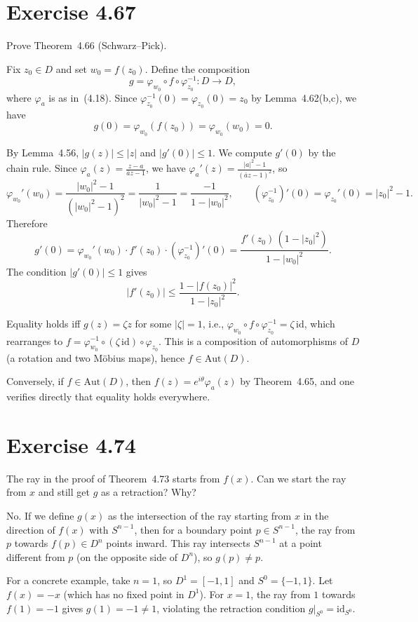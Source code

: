 \documentclass{article}
\begin{document}
\section{Exercise 4.67}

Prove Theorem~4.66 (Schwarz--Pick).

\begin{solution}
  Fix $z_0 \in D$ and set $w_0 = f(z_0)$. Define the composition
  \[
    g = \varphi_{w_0} \circ f \circ \varphi_{z_0}^{-1} : D \to D,
  \]
  where $\varphi_a$ is as in~(4.18). Since $\varphi_{z_0}^{-1}(0) =
  \varphi_{z_0}(0) = z_0$ by Lemma~4.62(b,c), we have
  \[
    g(0) = \varphi_{w_0}(f(z_0)) = \varphi_{w_0}(w_0) = 0.
  \]

  By Lemma~4.56, $|g(z)| \le |z|$ and $|g'(0)| \le 1$. We compute
  $g'(0)$ by the chain rule. Since
  $\varphi_a(z) = \frac{z - a}{\bar{a}z - 1}$, we have
  $\varphi_a'(z) = \frac{|a|^2 - 1}{(\bar{a}z - 1)^2}$, so
  \[
    \varphi_{w_0}'(w_0) = \frac{|w_0|^2 - 1}{(|w_0|^2 - 1)^2}
    = \frac{1}{|w_0|^2 - 1} = \frac{-1}{1 - |w_0|^2},
    \qquad
    (\varphi_{z_0}^{-1})'(0) = \varphi_{z_0}'(0) = |z_0|^2 - 1.
  \]
  Therefore
  \[
    g'(0) = \varphi_{w_0}'(w_0) \cdot f'(z_0) \cdot
    (\varphi_{z_0}^{-1})'(0)
    = \frac{f'(z_0)\,(1 - |z_0|^2)}{1 - |w_0|^2}.
  \]
  The condition $|g'(0)| \le 1$ gives
  \[
    |f'(z_0)| \le \frac{1 - |f(z_0)|^2}{1 - |z_0|^2}.
  \]

  Equality holds iff $g(z) = \zeta z$ for some $|\zeta| = 1$, i.e.,
  $\varphi_{w_0} \circ f \circ \varphi_{z_0}^{-1} = \zeta \,\mathrm{id}$,
  which rearranges to
  $f = \varphi_{w_0}^{-1} \circ (\zeta\,\mathrm{id}) \circ \varphi_{z_0}$.
  This is a composition of automorphisms of $D$ (a rotation and two
  M\"obius maps), hence $f \in \mathrm{Aut}(D)$.

  Conversely, if $f \in \mathrm{Aut}(D)$, then
  $f(z) = e^{i\theta}\varphi_a(z)$ by Theorem~4.65, and one verifies
  directly that equality holds everywhere.
\end{solution}

\section{Exercise 4.74}

The ray in the proof of Theorem~4.73 starts from $f(x)$. Can we start
the ray from $x$ and still get $g$ as a retraction? Why?

\begin{solution}
  No. If we define $g(x)$ as the intersection of the ray starting from
  $x$ in the direction of $f(x)$ with $S^{n-1}$, then for a boundary
  point $p \in S^{n-1}$, the ray from $p$ towards $f(p) \in D^n$
  points inward. This ray intersects $S^{n-1}$ at a point different
  from $p$ (on the opposite side of $D^n$), so $g(p) \ne p$.

  For a concrete example, take $n = 1$, so $D^1 = [-1,1]$ and
  $S^0 = \{-1, 1\}$. Let $f(x) = -x$ (which has no fixed point in
  $D^1$). For $x = 1$, the ray from $1$ towards $f(1) = -1$ gives
  $g(1) = -1 \ne 1$, violating the retraction condition
  $g|_{S^0} = \mathrm{id}_{S^0}$.
\end{solution}
\end{document}
